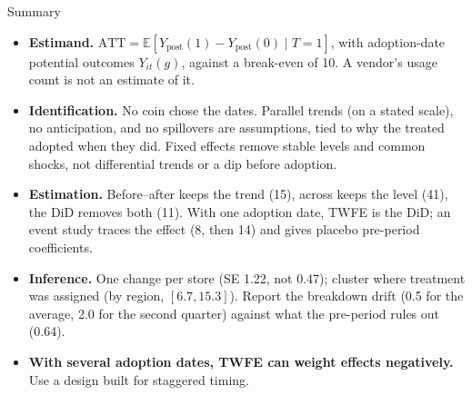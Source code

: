 \documentclass[aspectratio=169, 11pt, handout]{beamer}
\newcommand{\E}{\mathbb{E}}
\newcommand{\ATT}{\text{ATT}}
\newcommand{\spinestep}[1]{\textcolor{sbgreen}{\textbf{#1}}}
\begin{document}
\begin{frame}{Summary}

\begin{itemize}
  \item \spinestep{Estimand.} $\ATT = \E[Y_{\text{post}}(1) - Y_{\text{post}}(0) \mid T = 1]$, with adoption-date potential outcomes $Y_{it}(g)$, against a break-even of 10. A vendor's usage count is not an estimate of it.
  \item \spinestep{Identification.} No coin chose the dates. Parallel trends (on a stated scale), no anticipation, and no spillovers are assumptions, tied to why the treated adopted when they did. Fixed effects remove stable levels and common shocks, not differential trends or a dip before adoption.
  \item \spinestep{Estimation.} Before--after keeps the trend (15), across keeps the level (41), the DiD removes both (11). With one adoption date, TWFE is the DiD; an event study traces the effect (8, then 14) and gives placebo pre-period coefficients.
  \item \spinestep{Inference.} One change per store (SE 1.22, not 0.47); cluster where treatment was assigned (by region, $[6.7, 15.3]$). Report the breakdown drift (0.5 for the average, 2.0 for the second quarter) against what the pre-period rules out (0.64).
  \item \textbf{With several adoption dates, TWFE can weight effects negatively.} Use a design built for staggered timing.
\end{itemize}
\end{frame}
\end{document}
